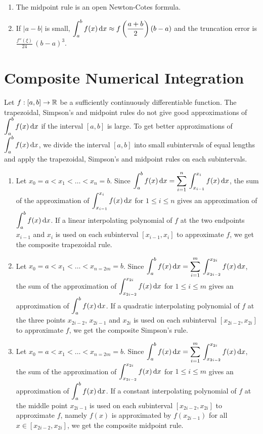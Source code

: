 \begin{rmkList}
\begin{enumerate}
\item The midpoint rule is an open Newton-Cotes formula.
\item If $|a-b|$ is small,
$\displaystyle \int_a^b  f(x)\,\mathrm{d}x \approx
f\left(\frac{a+b}{2}\right)(b-a)$ and the truncation error is
$\displaystyle \frac{f''(\xi)}{24}\,(b-a)^3$.
\end{enumerate}
\end{rmkList}

\section{Composite Numerical Integration}
\label{composite}

Let $f:[a,b] \rightarrow \mathbb{R}$ be a sufficiently continuously
differentiable function.  The trapezoidal, Simpson's and midpoint
rules do not give good approximations of
$\displaystyle \int_a^b f(x)\,\mathrm{d}x$ if the
interval $[a,b]$ is large.  To get better approximations of
$\displaystyle \int_a^b f(x) \,\mathrm{d}x$, we divide the interval $[a,b]$
into small subintervals of equal lengths and apply the trapezoidal,
Simpson's and midpoint rules on each subintervals.

\begin{enumerate}
\item Let $x_0=a < x_1 < \ldots < x_n =b$.  Since
$\displaystyle \int_a^b f(x) \,\mathrm{d}x =
\sum_{i=1}^n\, \int_{x_{i-1}}^{x_i} f(x)\,\mathrm{d}x$, the sum of the
approximation of
$\displaystyle \int_{x_{i-1}}^{x_i} f(x) \,\mathrm{d}x$ for $1 \leq i \leq n$
gives an approximation of
$\displaystyle \int_a^b f(x) \,\mathrm{d}x$.
If a linear interpolating polynomial of $f$ at the two endpoints $x_{i-1}$ and
$x_i$ is used on each subinterval $[x_{i-1},x_i]$ to approximate $f$, we get
the composite trapezoidal rule.
\item Let $x_0=a < x_1 < \ldots < x_{n=2m} =b$.  Since
$\displaystyle \int_a^b f(x) \,\mathrm{d}x =
\sum_{i=1}^m\, \int_{x_{2i-2}}^{x_{2i}} f(x)\,\mathrm{d}x$, the sum of the
approximation of
$\displaystyle \int_{x_{2i-2}}^{x_{2i}} f(x) \,\mathrm{d}x$ for $1 \leq i \leq m$
gives an approximation of $\displaystyle \int_a^b f(x) \,\mathrm{d}x$.
If a quadratic interpolating polynomial of $f$ at the three points $x_{2i-2}$,
$x_{2i-1}$ and $x_{2i}$ is used on each subinterval $[x_{2i-2},x_{2i}]$ to
approximate $f$, we get the composite Simpson's rule.
\item Let $x_0=a < x_1 < \ldots < x_{n=2m} =b$.  Since
$\displaystyle \int_a^b f(x) \,\mathrm{d}x =
\sum_{i=1}^m\, \int_{x_{2i-2}}^{x_{2i}} f(x) \,\mathrm{d}x$, the sum of
the approximation of
$\displaystyle \int_{x_{2i-2}}^{x_{2i}} f(x) \,\mathrm{d}x$ for
$1 \leq i \leq m$ gives an approximation of
$\displaystyle \int_a^b f(x) \,\mathrm{d}x$.
If a constant interpolating polynomial of $f$ at the middle point $x_{2i-1}$
is used on each subinterval $[x_{2i-2},x_{2i}]$ to approximate $f$,
namely $f(x)$ is approximated by $f(x_{2i-1})$ for all
$x \in [x_{2i-2},x_{2i}]$, we get the
composite midpoint rule.
\end{enumerate}

